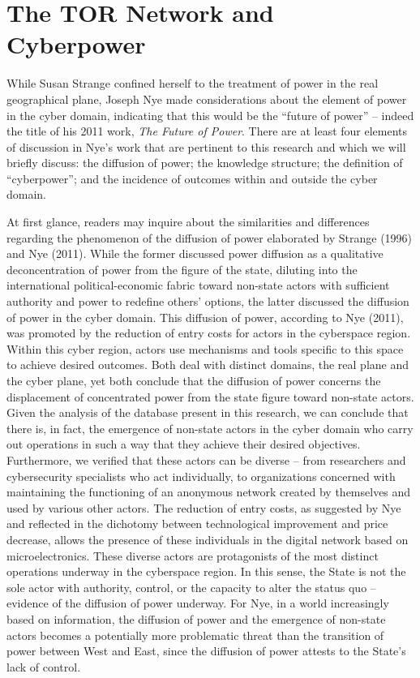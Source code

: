 \section{The TOR Network and Cyberpower}

While Susan Strange confined herself to the treatment of power in the real geographical plane, Joseph Nye made considerations about the element of power in the cyber domain, indicating that this would be the ``future of power'' -- indeed the title of his 2011 work, \textit{The Future of Power}. There are at least four elements of discussion in Nye's work that are pertinent to this research and which we will briefly discuss: the diffusion of power; the knowledge structure; the definition of ``cyberpower''; and the incidence of outcomes within and outside the cyber domain.

At first glance, readers may inquire about the similarities and differences regarding the phenomenon of the diffusion of power elaborated by Strange (1996) and Nye (2011). While the former discussed power diffusion as a qualitative deconcentration of power from the figure of the state, diluting into the international political-economic fabric toward non-state actors with sufficient authority and power to redefine others' options, the latter discussed the diffusion of power in the cyber domain. This diffusion of power, according to Nye (2011), was promoted by the reduction of entry costs for actors in the cyberspace region. Within this cyber region, actors use mechanisms and tools specific to this space to achieve desired outcomes. Both deal with distinct domains, the real plane and the cyber plane, yet both conclude that the diffusion of power concerns the displacement of concentrated power from the state figure toward non-state actors. Given the analysis of the database present in this research, we can conclude that there is, in fact, the emergence of non-state actors in the cyber domain who carry out operations in such a way that they achieve their desired objectives. Furthermore, we verified that these actors can be diverse -- from researchers and cybersecurity specialists who act individually, to organizations concerned with maintaining the functioning of an anonymous network created by themselves and used by various other actors. The reduction of entry costs, as suggested by Nye and reflected in the dichotomy between technological improvement and price decrease, allows the presence of these individuals in the digital network based on microelectronics. These diverse actors are protagonists of the most distinct operations underway in the cyberspace region. In this sense, the State is not the sole actor with authority, control, or the capacity to alter the status quo -- evidence of the diffusion of power underway. For Nye, in a world increasingly based on information, the diffusion of power and the emergence of non-state actors becomes a potentially more problematic threat than the transition of power between West and East, since the diffusion of power attests to the State's lack of control.


